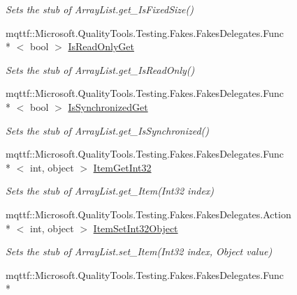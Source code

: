 \begin{DoxyCompactItemize}
\begin{DoxyCompactList}\small\item\em Sets the stub of Array\-List.\-get\-\_\-\-Is\-Fixed\-Size()\end{DoxyCompactList}\item 
mqttf\-::\-Microsoft.\-Quality\-Tools.\-Testing.\-Fakes.\-Fakes\-Delegates.\-Func\\*
$<$ bool $>$ \hyperlink{class_system_1_1_collections_1_1_fakes_1_1_stub_array_list_adc3267675a1c2a46202e8556ab4f2065}{Is\-Read\-Only\-Get}
\begin{DoxyCompactList}\small\item\em Sets the stub of Array\-List.\-get\-\_\-\-Is\-Read\-Only()\end{DoxyCompactList}\item 
mqttf\-::\-Microsoft.\-Quality\-Tools.\-Testing.\-Fakes.\-Fakes\-Delegates.\-Func\\*
$<$ bool $>$ \hyperlink{class_system_1_1_collections_1_1_fakes_1_1_stub_array_list_a3484fc72bc6df7f6f2764062215c92dc}{Is\-Synchronized\-Get}
\begin{DoxyCompactList}\small\item\em Sets the stub of Array\-List.\-get\-\_\-\-Is\-Synchronized()\end{DoxyCompactList}\item 
mqttf\-::\-Microsoft.\-Quality\-Tools.\-Testing.\-Fakes.\-Fakes\-Delegates.\-Func\\*
$<$ int, object $>$ \hyperlink{class_system_1_1_collections_1_1_fakes_1_1_stub_array_list_ac9c17792d1fcf8b0aad95f5e5c944e90}{Item\-Get\-Int32}
\begin{DoxyCompactList}\small\item\em Sets the stub of Array\-List.\-get\-\_\-\-Item(\-Int32 index)\end{DoxyCompactList}\item 
mqttf\-::\-Microsoft.\-Quality\-Tools.\-Testing.\-Fakes.\-Fakes\-Delegates.\-Action\\*
$<$ int, object $>$ \hyperlink{class_system_1_1_collections_1_1_fakes_1_1_stub_array_list_ac7c0b68be143418b8d62ded4ca556e0e}{Item\-Set\-Int32\-Object}
\begin{DoxyCompactList}\small\item\em Sets the stub of Array\-List.\-set\-\_\-\-Item(\-Int32 index, Object value)\end{DoxyCompactList}\item 
mqttf\-::\-Microsoft.\-Quality\-Tools.\-Testing.\-Fakes.\-Fakes\-Delegates.\-Func\\*

\end{DoxyCompactItemize}
